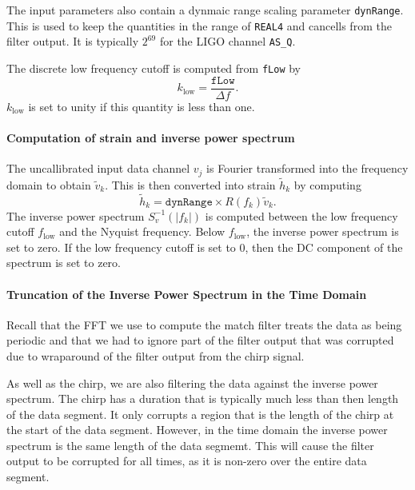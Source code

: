 The input parameters also contain a dynmaic range scaling parameter
\texttt{dynRange}. This is used to keep the quantities in the range of
\texttt{REAL4} and cancells from the filter output. It is typically $2^{69}$
for the LIGO channel \texttt{AS\_Q}.

The discrete low frequency cutoff is computed from \texttt{fLow} by
\begin{equation}
k_{\mathrm{low}} = \frac{\mathtt{fLow}}{\Delta f}.
\end{equation}
$k_{\mathrm{low}}$ is set to unity if this quantity is less than one.

\paragraph*{Computation of strain and inverse power spectrum}

The uncallibrated input data channel $v_j$ is Fourier transformed into the
frequency domain to obtain $\tilde{v}_k$. This is then converted into strain
$\tilde{h}_k$ by computing 
\begin{equation}
\tilde{h}_k = \mathtt{dynRange} \times R(f_k) \tilde{v}_k.
\end{equation}
The inverse power spectrum $S^{-1}_v(|f_k|)$ is computed between the low
frequency cutoff $f_{\mathrm{low}}$ and the Nyquist frequency. Below
$f_{\mathrm{low}}$, the inverse power spectrum is set to zero. If the low
frequency cutoff is set to $0$, then the DC component of the spectrum is
set to zero.

\paragraph*{Truncation of the Inverse Power Spectrum in the Time Domain}

Recall that the FFT we use to compute the match filter treats the data as
being periodic and that we had to ignore part of the filter output that was
corrupted due to wraparound of the filter output from the chirp signal. 

As well as the chirp, we are also filtering the data against the inverse power
spectrum. The chirp has a duration that is typically much less than then
length of the data segment. It only corrupts a region that is the length of
the chirp at the start of the data segment. However, in the time domain the
inverse power spectrum is the same length of the data segmemt. This will cause
the filter output to be corrupted for all times, as it is non-zero over the
entire data segment.

